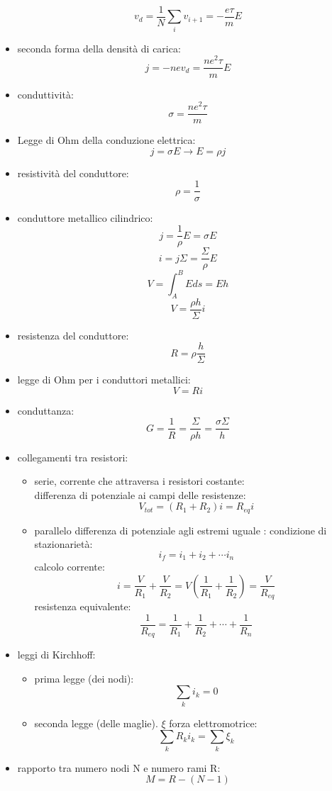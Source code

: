 \documentclass[a4paper,12pt, oneside]{book}
\begin{document}
\begin{itemize}
$$v_d=\frac{1}{N}\sum_i v_{i+1}=-\frac{e\tau}{m}E$$
\item seconda forma della densità di carica:
$$j=-nev_d=\frac{ne^2\tau}{m}E$$
\item conduttività:
$$\sigma=\frac{ne^2\tau}{m}$$
\item Legge di Ohm della conduzione elettrica:
$$j=\sigma E\to E=\rho j$$
\item resistività del conduttore:
$$\rho =\frac{1}{\sigma}$$
\item conduttore metallico cilindrico:
$$j=\frac{1}{\rho}E=\sigma E$$
$$i=j\Sigma=\frac{\Sigma}{\rho}E$$
$$V=\int_A^BEds=Eh$$
$$V=\frac{\rho h}{\Sigma}i$$
\item resistenza  del conduttore:
$$R=\rho\frac{h}{\Sigma}$$
\item legge di Ohm per i conduttori metallici:
$$V=Ri$$
\item conduttanza:
$$G=\frac{1}{R}=\frac{\Sigma}{\rho h}=\frac{\sigma\Sigma}{h}$$
\item collegamenti tra resistori:
\begin{itemize}
\item serie, corrente che attraversa i resistori costante:\\
differenza di potenziale ai campi delle resistenze:
$$V_{tot}=(R_1+R_2)i=R_{eq}i$$

\item parallelo differenza di potenziale agli estremi uguale :
condizione di stazionarietà:
$$i_f=i_1+i_2+\cdots i_n$$
calcolo corrente:
$$i=\frac{V}{R_1}+\frac{V}{R_2}=V\left(\frac{1}{R_1}+\frac{1}{R_2}\right)=\frac{V}{R_{eq}}$$
resistenza equivalente:
$$\frac{1}{R_{eq}}=\frac{1}{R_1}+\frac{1}{R_2}+\cdots+\frac{1}{R_n}$$
\end{itemize}
\item leggi di Kirchhoff:
\begin{itemize}
\item prima legge (dei nodi):
$$\sum_ki_k=0$$
\item seconda legge (delle maglie). $\xi$ forza elettromotrice:
$$\sum_kR_ki_k=\sum_k\xi_k$$
\end{itemize}
\item rapporto tra numero nodi N e numero rami R:
$$M=R-(N-1)$$
\end{itemize}
\end{document}
